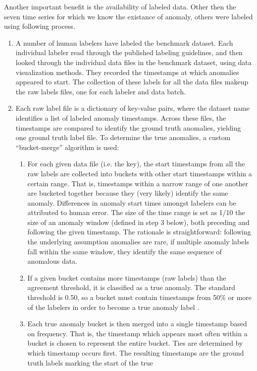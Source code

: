 \documentclass[12pt]{article}
\begin{document}
Another important benefit is the availability of labeled data. Other then the seven time series for which we know the existance of anomaly, others were labeled using following process.
\begin{enumerate}
\item A number of human labelers have labeled the benchmark dataset. Each individual labeler read through the published labeling guidelines, and then looked through the individual data files in the benchmark dataset, using data visualization methods. They recorded the timestamps at which anomalies appeared to start. The collection of these labels for all the data
files makeup the raw labels files, one for each labeler and data batch.
\item Each raw label file is a dictionary of key-value pairs, where the dataset
name identifies a list of labeled anomaly timestamps. Across these files,
the timestamps are compared to identify the ground truth anomalies,
yielding one ground truth label file. To determine the true anomalies, a
custom “bucket-merge” algorithm is used:
\begin{enumerate}
\item For each given data file (i.e. the key), the start timestamps from all
the raw labels are collected into buckets with other start timestamps
within a certain range. That is, timestamps within a narrow range of
one another are bucketed together because they (very likely)
identify the same anomaly. Differences in anomaly start times
amongst labelers can be attributed to human error. The size of the
time range is set as 1/10 the size of an anomaly window (defined in
step 3 below), both preceding and following the given timestamp.
The rationale is straightforward: following the underlying
assumption anomalies are rare, if multiple anomaly labels fall within
the same window, they identify the same sequence of anomalous
data.
\item If a given bucket contains more timestamps (raw labels) than the
agreement threshold, it is classified as a true anomaly. The
standard threshold is 0.50, so a bucket must contain timestamps
from 50\% or more of the labelers in order to become a true
anomaly label .
\item Each true anomaly bucket is then merged into a single timestamp
based on frequency. That is, the timestamp which appears most
often within a bucket is chosen to represent the entire bucket. Ties
are determined by which timestamp occurs first. The resulting
timestamps are the ground truth labels marking the start of the true

\end{enumerate}
\end{enumerate}
\end{document}

